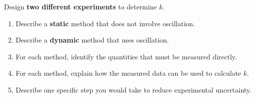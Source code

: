 \documentclass[12pt]{article}
\begin{document}
Design \textbf{two different experiments} to determine $k$.

\begin{enumerate}[label=\textbf{(\alph*)}]
\item Describe a \textbf{static} method that does not involve oscillation.
\item Describe a \textbf{dynamic} method that uses oscillation.
\item For each method, identify the quantities that must be measured directly.
\item For each method, explain how the measured data can be used to calculate $k$.
\item Describe one specific step you would take to reduce experimental uncertainty.
\end{enumerate}
\end{document}

